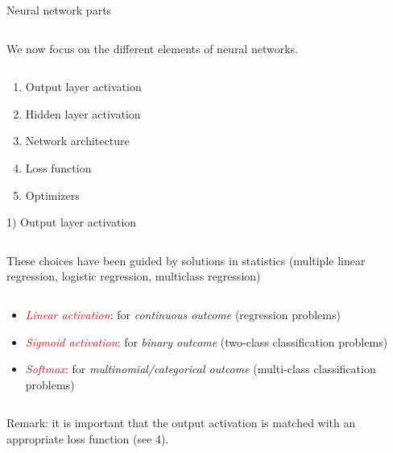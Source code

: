 \documentclass[10pt,ignorenonframetext,]{beamer}
\providecommand{\tightlist}{%
  \setlength{\itemsep}{0pt}\setlength{\parskip}{0pt}}
\begin{document}
\begin{frame}{Neural network parts}
\protect\hypertarget{neural-network-parts}{}

\(~\)

We now focus on the different elements of neural networks.

\(~\)

\begin{enumerate}
[1)]
\tightlist
\item
  Output layer activation
\item
  Hidden layer activation
\item
  Network architecture
\item
  Loss function
\item
  Optimizers
\end{enumerate}

\end{frame}

\begin{frame}

\begin{block}{1) Output layer activation}

\(~\)

These choices have been guided by solutions in statistics (multiple
linear regression, logistic regression, multiclass regression)

\(~\)

\begin{itemize}
\item
  \emph{\textcolor{red}{Linear activation}}: for \emph{continuous
  outcome} (regression problems) \vspace{2mm}
\item
  \emph{\textcolor{red}{Sigmoid activation}}: for \emph{binary outcome}
  (two-class classification problems) \vspace{2mm}
\item
  \emph{\textcolor{red}{Softmax}}: for \emph{multinomial/categorical
  outcome} (multi-class classification problems)
\end{itemize}

\(~\)

Remark: it is important that the output activation is matched with an
appropriate loss function (see 4).

\end{block}

\end{frame}
\end{document}

